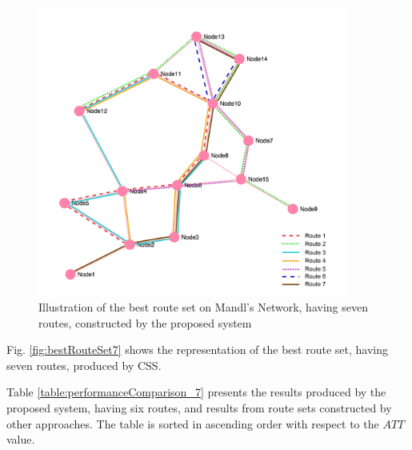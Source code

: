 \begin{figure}[H]
    \begin{center}
    \includegraphics[width=4in]{assets/mandlnetwork_7routes.png}
    \end{center}
    \caption{Illustration of the best route set on Mandl's Network, having seven routes, constructed by the proposed system}
    \label{fig:bestRouteSet7} 
\end{figure}

Fig. \vref{fig:bestRouteSet7} shows the representation of the best route set, having seven routes, produced by CSS.

Table \vref{table:performanceComparison_7} presents the results produced by the proposed system, having six routes, and results from route sets constructed by other approaches. The table is sorted in ascending order with respect to the $ATT$ value.

